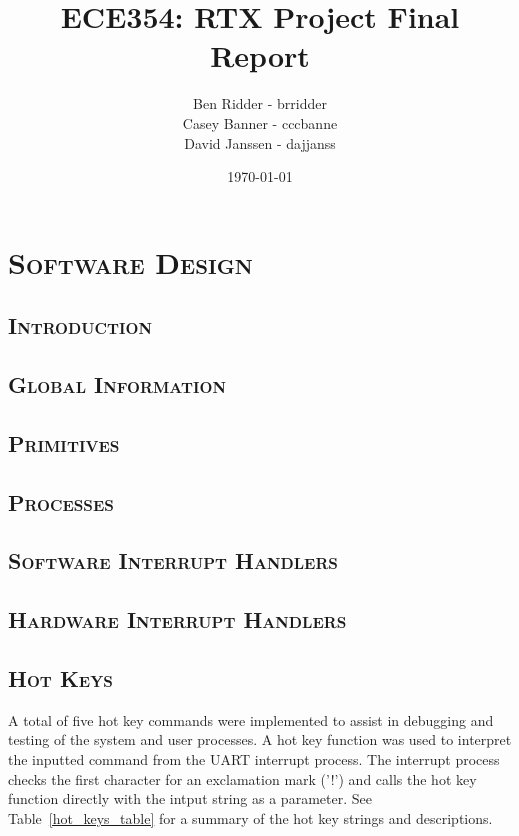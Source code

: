 \documentclass[oneside]{report}
\begin{document}
\lstset{language=C, 
        frame=single, 
        breaklines=true,
        basicstyle=\small\ttfamily,
        columns=fullflexible}


\title{ECE354: RTX Project Final Report}
\author{Ben Ridder - brridder \\
Casey Banner - cccbanne \\
David Janssen - dajjanss }
\date{\today}

\maketitle

\tableofcontents

\chapter{\textsc{Software Design}}

\section{\textsc{Introduction}}

\section{\textsc{Global Information}}

\section{\textsc{Primitives}}

\section{\textsc{Processes}}

\section{\textsc{Software Interrupt Handlers}}

\section{\textsc{Hardware Interrupt Handlers}}

\section{\textsc{Hot Keys}}
A total of five hot key commands were implemented to assist in debugging and
testing of the system and user processes. A hot key function was used to
interpret the inputted command from the UART interrupt process. The interrupt
process checks the first character for an exclamation mark ('!') and calls the
hot key function directly with the intput string as a parameter. See
Table~\ref{hot_keys_table} for a summary of the hot key strings and descriptions.
\end{document}
